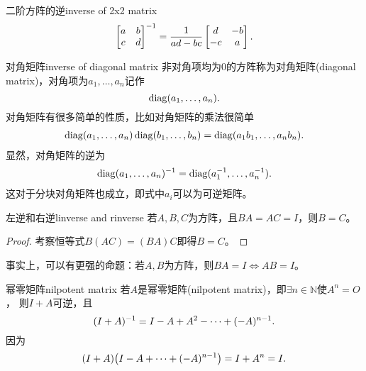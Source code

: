 \begin{example}{二阶方阵的逆}{inverse of 2x2 matrix}
	\begin{equation}
		\begin{bmatrix}
			a&b\\c&d
		\end{bmatrix}^{-1}=\frac1{ad-bc}
		\begin{bmatrix}
			d&-b\\
			-c&a
		\end{bmatrix}.
	\end{equation}
\end{example}
\begin{example}{对角矩阵}{inverse of diagonal matrix}
	非对角项均为0的方阵称为对角矩阵(diagonal matrix)，对角项为$a_1,\ldots,a_n$记作
	\[
		\operatorname{diag}(a_1,\ldots,a_n).
	\]
	对角矩阵有很多简单的性质，比如对角矩阵的乘法很简单
	\begin{align}
		\operatorname{diag}(a_1,\ldots,a_n)\operatorname{diag}(b_1,\ldots,b_n)=\operatorname{diag}(a_1b_1,\ldots,a_nb_n).
	\end{align}
	显然，对角矩阵的逆为
	\begin{align}
		\operatorname{diag}(a_1,\ldots,a_n)^{-1}=\operatorname{diag}(a_1^{-1},\ldots,a_n^{-1}).
	\end{align}
	这对于分块对角矩阵也成立，即式中$a_i$可以为可逆矩阵。
\end{example}
\begin{theorem}{左逆和右逆}{linverse and rinverse}
	若$A,B,C$为方阵，且$BA=AC=I$，则$B=C$。
\end{theorem}
\begin{proof}
	考察恒等式$B(AC)=(BA)C$即得$B=C$。
\end{proof}
\begin{remark}
	事实上，可以有更强的命题：若$A,B$为方阵，则$BA=I\iff AB=I$。
\end{remark}
\begin{example}{幂零矩阵}{nilpotent matrix}
	若$A$是幂零矩阵(nilpotent matrix)，即$\exists n\in\mathbb N$使$A^n=O$，
	则$I+A$可逆，且
	\[
		(I+A)^{-1}=I-A+A^2-\cdots+(-A)^{n-1}.
	\]
	因为
	\[
		(I+A)\bigl(I-A+\cdots+(-A)^{n-1}\bigr)=I+A^n=I.
	\]
\end{example}

